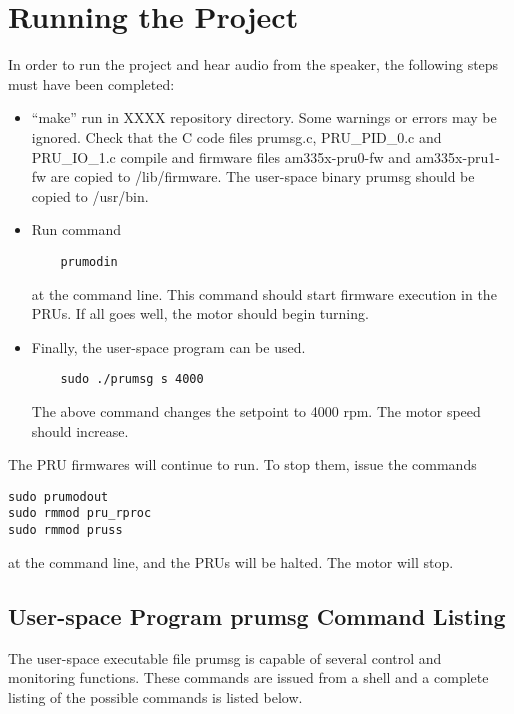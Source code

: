\chapter{Running the Project}

In order to run the project and hear audio from the speaker, the following steps must have been completed:

\begin{itemize}
	\item ``make'' run in XXXX repository directory.  Some warnings or errors may be ignored.  Check that the C code files prumsg.c, PRU\_PID\_0.c and PRU\_IO\_1.c compile and firmware files am335x-pru0-fw and am335x-pru1-fw are copied to /lib/firmware.  The user-space binary prumsg should be copied to /usr/bin.
	
	\item Run command 
	
	\begin{verbatim}
	prumodin
	\end{verbatim} 
	
	at the command line.  This command should start firmware execution in the PRUs.
	If all goes well, the motor should begin turning.
	
	\item  Finally, the user-space program can be used.
	
	\begin{verbatim}
	sudo ./prumsg s 4000
	\end{verbatim}
	
	The above command changes the setpoint to 4000 rpm.  The motor speed should increase.
\end{itemize}

The PRU firmwares will continue to run.  To stop them, issue the commands

\begin{verbatim}
sudo prumodout
sudo rmmod pru_rproc
sudo rmmod pruss
\end{verbatim}

at the command line, and the PRUs will be halted.  The motor will stop.

\section{User-space Program prumsg Command Listing}

The user-space executable file prumsg is capable of several control and monitoring functions.  These commands are issued from a shell and a complete listing of the possible commands is listed below.

